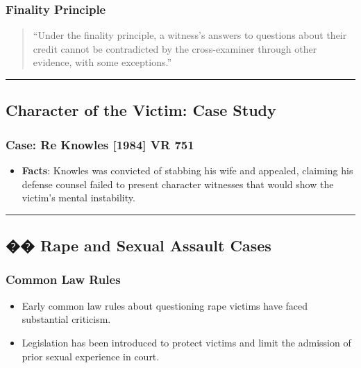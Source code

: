 \subsubsection{Finality Principle}\label{finality-principle}

\begin{quote}
``Under the finality principle, a witness's answers to questions about
their credit cannot be contradicted by the cross-examiner through other
evidence, with some exceptions.''
\end{quote}

\begin{center}\rule{0.5\linewidth}{0.5pt}\end{center}

\subsection{  Character of the Victim: Case
Study}\label{character-of-the-victim-case-study}

\subsubsection{Case: Re Knowles {[}1984{]} VR
751}\label{case-re-knowles-1984-vr-751}

\begin{itemize}
\tightlist
\item
  \textbf{Facts}: Knowles was convicted of stabbing his wife and
  appealed, claiming his defense counsel failed to present character
  witnesses that would show the victim's mental instability.
\end{itemize}

\begin{center}\rule{0.5\linewidth}{0.5pt}\end{center}

\subsection{�� Rape and Sexual Assault
Cases}\label{rape-and-sexual-assault-cases}

\subsubsection{Common Law Rules}\label{common-law-rules}

\begin{itemize}
\tightlist
\item
  Early common law rules about questioning rape victims have faced
  substantial criticism.
\item
  Legislation has been introduced to protect victims and limit the
  admission of prior sexual experience in court.
\end{itemize}

